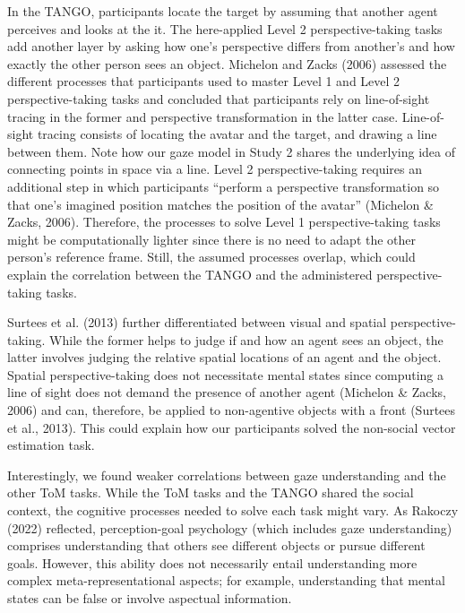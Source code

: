 \documentclass[
  man,mask,floatsintext]{apa7}
\begin{document}
In the TANGO, participants locate the target by assuming that another agent perceives and looks at the it. The here-applied Level 2 perspective-taking tasks add another layer by asking how one's perspective differs from another's and how exactly the other person sees an object. Michelon and Zacks (2006) assessed the different processes that participants used to master Level 1 and Level 2 perspective-taking tasks and concluded that participants rely on line-of-sight tracing in the former and perspective transformation in the latter case. Line-of-sight tracing consists of locating the avatar and the target, and drawing a line between them. Note how our gaze model in Study 2 shares the underlying idea of connecting points in space via a line. Level 2 perspective-taking requires an additional step in which participants ``perform a perspective transformation so that one's imagined position matches the position of the avatar'' (Michelon \& Zacks, 2006). Therefore, the processes to solve Level 1 perspective-taking tasks might be computationally lighter since there is no need to adapt the other person's reference frame. Still, the assumed processes overlap, which could explain the correlation between the TANGO and the administered perspective-taking tasks.

Surtees et al. (2013) further differentiated between visual and spatial perspective-taking. While the former helps to judge if and how an agent sees an object, the latter involves judging the relative spatial locations of an agent and the object. Spatial perspective-taking does not necessitate mental states since computing a line of sight does not demand the presence of another agent (Michelon \& Zacks, 2006) and can, therefore, be applied to non-agentive objects with a front (Surtees et al., 2013). This could explain how our participants solved the non-social vector estimation task.

Interestingly, we found weaker correlations between gaze understanding and the other ToM tasks. While the ToM tasks and the TANGO shared the social context, the cognitive processes needed to solve each task might vary. As Rakoczy (2022) reflected, perception-goal psychology (which includes gaze understanding) comprises understanding that others see different objects or pursue different goals. However, this ability does not necessarily entail understanding more complex meta-representational aspects; for example, understanding that mental states can be false or involve aspectual information.
\end{document}
